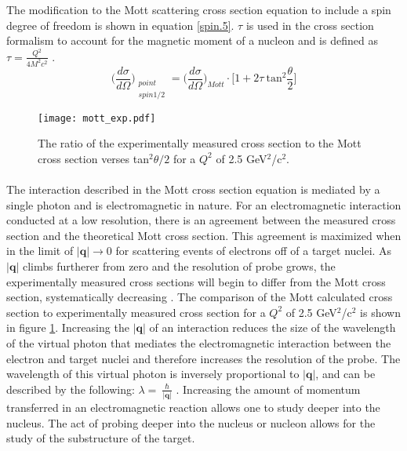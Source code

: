 The modification to the Mott scattering cross section equation to include a spin degree of freedom is shown in equation \ref{spin.5}. $\tau$ is used in the cross section formalism to account for the magnetic moment of a nucleon and is defined as $\tau = \frac{Q^2}{4M^2c^2}$ \cite{PnN}. 
\begin{equation}
\bigg(\frac{d\sigma}{d\Omega}\bigg)_{\substack{point \\ spin 1/2}} = \bigg(\frac{d\sigma}{d\Omega}\bigg)_{Mott} \cdot \big[1 + 2\tau \: \text{tan}^2\frac{\theta}{2} \big]\label{spin.5}
\end{equation}

\begin{figure}[]
	\centering
	\textbf{ }\par\medskip
	\texttt{[image: mott\_exp.pdf]}
	\caption{The ratio of the experimentally measured cross section to the Mott cross section verses tan$^2\theta/2$ for a $Q^2$ of 2.5 GeV$^2$/c$^2$. \cite{EPinter}}
	\label{mott_exp}
\end{figure}

\paragraph{}The interaction described in the Mott cross section equation is mediated by a single photon and is electromagnetic in nature. For an electromagnetic interaction conducted at a low resolution, there is an agreement between the measured cross section and the theoretical Mott cross section. This agreement is maximized when in the limit of $|\boldsymbol{q}| \rightarrow  0$ for scattering events of electrons off of a target nuclei. As $|\boldsymbol{q}|$ climbs furtherer from zero and the resolution of probe grows, the experimentally measured cross sections will begin to differ from the Mott cross section, systematically decreasing \cite{PnN}. The comparison of the Mott calculated cross section to experimentally measured cross section for a $Q^2$ of 2.5 GeV$^2$/c$^2$ is shown in figure \ref{mott_exp}. Increasing the $|\boldsymbol{q}|$ of an interaction reduces the size of the wavelength of the virtual photon that mediates the electromagnetic interaction between the electron and target nuclei and therefore increases the resolution of the probe. The wavelength of this virtual photon is inversely proportional to $|\boldsymbol{q}|$, and can be described by the following: $\lambda = \ \frac{\hbar}{|\boldsymbol{q}|}$ \cite{PnN}. Increasing the amount of momentum transferred in an electromagnetic reaction allows one to study deeper into the nucleus. The act of probing deeper into the nucleus or nucleon allows for the study of the substructure of the target. 
